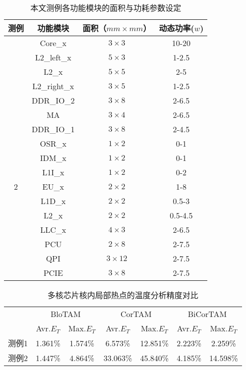 \begin{table}
\centering
\caption{本文测例各功能模块的面积与功耗参数设定}
\begin{tabular}{c c c c}
\hline\hline
测例 & 功能模块 & 面积（$mm \times mm$） & 动态功率($w$) \\
\hline
 & Core\_x & $3\times 3$ & 10-20 \\

 & L2\_left\_x & $5\times 3$ & 1-2.5 \\
\raisebox{1.5ex}{1}
 & L2\_x & $5\times 5$ & 2-5 \\
 & L2\_right\_x & $3\times 5$ & 1-2.5 \\
\hline
 & DDR\_IO\_2 & $3 \times 8$ & 2-6.5 \\
 & MA & $3 \times 4$ & 2-6.5 \\
 & DDR\_IO\_1 & $3 \times 8$ & 2-4.5 \\
 & OSR\_x & $1 \times 2$ & 0-1 \\
 & IDM\_x & $1 \times 2$ & 0-1 \\
 & L1I\_x & $1 \times 2$ & 0-2 \\
2 & EU\_x & $2 \times 2$ & 1-8 \\
 & L1D\_x & $2 \times 2$ & 0.5-3 \\
 & L2\_x & $2 \times 2$ & 0.5-4.5 \\
 & LLC\_x & $4 \times 3$ & 2-6.5 \\
 & PCU & $2 \times 8$ & 2-7.5 \\
 & QPI & $3 \times 12$ & 2-7.5 \\
 & PCIE & $3 \times 8$ & 2-7.5 \\
\hline
\end{tabular}
\label{tab:chap5:exp-flp-parameters}
\end{table}


\begin{table}
\centering
\caption{多核芯片核内局部热点的温度分析精度对比}
\begin{tabular}{c c c c c c c}
\hline\hline
 & \multicolumn{2}{c}{BloTAM} & \multicolumn{2}{c}{CorTAM} & \multicolumn{2}{c}{BiCorTAM} \\
 & Avr.$E_T$ & Max.$E_T$ & Avr.$E_T$ & Max.$E_T$ & Avr.$E_T$ & Max.$E_T$ \\
 \hline
测例1 & 1.361\% & 1.574\% & 6.573\% & 12.851\% & 2.223\% & 2.259\% \\
\hline
测例2 & 1.447\% & 4.864\% & 33.063\% & 45.840\% & 4.185\% & 14.598\% \\
\hline
\end{tabular}
\label{tab:chap5:temp-error}
\end{table}


